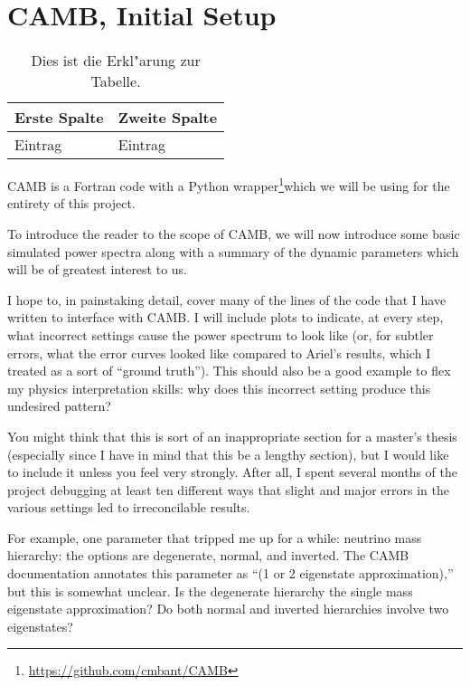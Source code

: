 \chapter{CAMB, Initial Setup}


\begin{table}[htb]
\centering
\begin{tabular}{l|l}
Erste Spalte & Zweite Spalte \\ \hline
Eintrag & Eintrag
\end{tabular}
 \caption[Kurzform f"ur das Tabellenverzeichnis]{Dies ist die Erkl"arung zur Tabelle.}
\end{table}

CAMB is a Fortran code with a Python wrapper\footnote{
\url{https://github.com/cmbant/CAMB}
}which we will be using for the
entirety of this project.

To introduce the reader to the scope of CAMB, we will now introduce
some basic simulated power spectra along with a summary of the dynamic
parameters which will be of greatest interest to us.

I hope to, in painstaking detail, cover many of the lines of the code that I
have written to interface with CAMB. I will include plots to indicate, at
every step, what incorrect settings cause the power spectrum to look like (or,
for subtler errors, what the error curves looked like compared to Ariel's
results, which I treated as a sort of ``ground truth''). This should also be a
good example to flex my physics interpretation skills: why does this incorrect
setting produce this undesired pattern?

You might think that this is sort of an inappropriate section for a master's thesis (especially since I have in mind that this be a lengthy section), but I would like to include it unless you feel very strongly. After all, I spent several months of the project debugging at least ten different ways that slight and major errors in the various settings led to irreconcilable results.

For example, one parameter that tripped me up for a while: neutrino mass hierarchy: the options are degenerate, normal, and inverted. The CAMB documentation annotates this parameter as ``(1 or 2 eigenstate approximation),'' but this is somewhat unclear. Is the degenerate hierarchy the single mass eigenstate approximation? Do both normal and inverted hierarchies involve two eigenstates?


